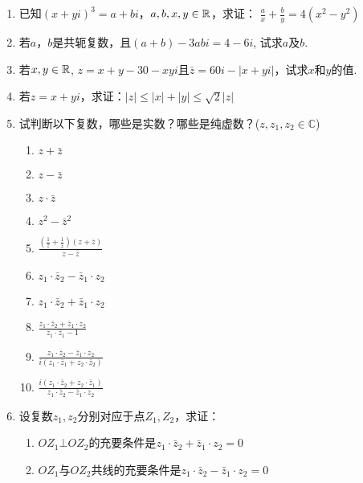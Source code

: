 \begin{enumerate}
\item 已知$(x+yi)^3=a+bi$，$a,b,x,y\in\mathbb{R}$，求证：
$\frac{a}{x}+\frac{b}{y}=4(x^2-y^2)$

\item 若$a$，$b$是共轭复数，且$(a+b)-3abi=4-6i$, 试求$a$及$b$.
\item 若$x,y\in\mathbb{R}$, $z=x+y-30-xyi$且$\bar z=60i-|x+yi|$，试求$x$和$y$的值.
\item 若$z=x+yi$，求证：$|z|\le |x|+|y|\le \sqrt{2}|z|$
\item 试判断以下复数，哪些是实数？哪些是纯虚数？($z,z_1,z_2\in\mathbb{C}$)
\begin{multicols}{2}
\begin{enumerate}[(1)]
    \item $z+\bar z$
    \item $z-\bar z$
    \item $z\cdot \bar z$
    \item $z^2-\bar z^2$
    \item $\frac{\left(\frac{1}{z}+\frac{1}{\bar z}\right)(z+\bar z)}{z-\bar z}$
    \item $z_1\cdot \bar z_2-\bar z_1\cdot z_2$
    \item $z_1\cdot \bar z_2+\bar z_1\cdot z_2$
    \item $\frac{z_1\cdot \bar z_2+\bar z_1\cdot z_2}{z_1\cdot \bar z_1-1}$
    \item $\frac{z_1\cdot \bar z_2-\bar z_1\cdot z_2}{i(z_1\cdot \bar z_1+z_2\cdot \bar z_2)}$
    \item $\frac{i(z_1\cdot \bar z_2+z_2\cdot \bar z_1)}{z_1\cdot \bar z_2-\bar z_1\cdot z_2}$
\end{enumerate}
\end{multicols}

\item 设复数$z_1,z_2$分别对应于点$Z_1,Z_2$，求证：
\begin{enumerate}[(1)]
    \item $OZ_1\bot OZ_2$的充要条件是$z_1\cdot \bar z_2+\bar z_1\cdot z_2=0$
    \item $OZ_1$与$OZ_2$共线的充要条件是$z_1\cdot \bar z_2-\bar z_1\cdot z_2=0$
\end{enumerate}


\end{enumerate}
